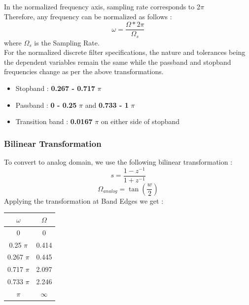 \documentclass{article}
\begin{document}
In the normalized frequency axis, sampling rate corresponds to 2$\pi$\\
Therefore, any frequency can be normalized as follows :
\begin{equation*}
    \omega = \frac{\Omega*2\pi}{\Omega_s}
\end{equation*}
where $\Omega_s$ is the Sampling Rate.\\

\vspace{1em}
\noindent
For the normalized discrete filter specifications, the nature and tolerances being the dependent variables remain the same while the passband and stopband frequencies change as per the above transformations. 
\begin{itemize}
    \item Stopband : \textbf{0.267 - 0.717} {$\pi$}
    \item Passband : \textbf{0 -  0.25} {$\pi$} and \textbf{0.733 - 1} {$\pi$}
    \item  Transition band : \textbf{0.0167} $\pi$ on either side of stopband
\end{itemize}

\subsubsection{Bilinear Transformation}
To convert to analog domain, we use the following bilinear transformation :
\begin{equation*}
    s = \frac{1 - z^{-1}}{1 + z^{-1}}
\end{equation*}
\begin{equation*}
    \Omega_{analog} = \tan (\frac{w}{2})
\end{equation*}
Applying the transformation at Band Edges we get :
\begin{table}[H]
		\begin{center}
		\begin{tabular}{|c|c|}
			\hline
			$\omega$ & $\Omega$\\
			
			\hline
                0 & 0\\
                \hline
                0.25 $\pi$ & 0.414 \\
                \hline
                0.267 $\pi$ & 0.445\\
                \hline
                0.717 $\pi$ & 2.097\\
                \hline
                0.733 $\pi$ & 2.246\\
                \hline
                $\pi$ & $\infty$\\
                \hline
            
		\end{tabular}
		\end{center}
\end{table}
\end{document}
